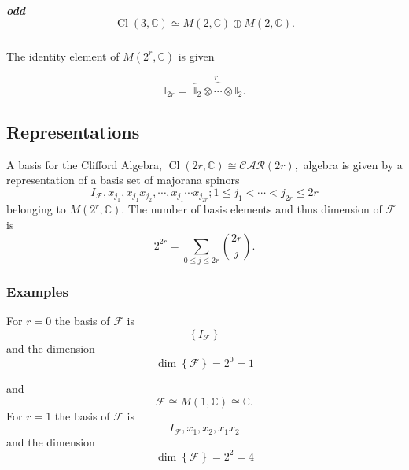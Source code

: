 \documentclass[aps,preprint]{revtex4}%
\begin{document}
\subparagraph{odd%
\begin{equation}
\operatorname*{Cl}\left(  3,\mathbb{C}\right)  \simeq M\left(  2,\mathbb{C}%
\right)  \oplus M\left(  2,\mathbb{C}\right)  .
\end{equation}
}

The identity element of $M\left(  2^{r},\mathbb{C}\right)  $ is given%

\begin{equation}
\mathbb{I}_{2r}=\overset{r}{\,\,\overbrace{\mathbb{I}_{2}\otimes\cdots
\otimes\mathbb{I}_{2}}}.
\end{equation}


\subsection{Representations}

A basis for the Clifford Algebra, $\operatorname*{Cl}\left(  2r,\mathbb{C}%
\right)  \cong\mathcal{CAR}\left(  2r\right)  ,$ algebra is given by a
representation of a basis set of majorana spinors
\begin{equation}
I_{\mathcal{F}},x_{j_{1}},x_{j_{1}}x_{j_{2}},\cdots,x_{j_{1}}\cdots x_{j_{2r}%
};1\leq j_{1}<\cdots<j_{2r}\leq2r
\end{equation}
belonging to $M\left(  2^{r},\mathbb{C}\right)  .$ The number of basis
elements and thus dimension of $\mathcal{F}$ is
\begin{equation}
2^{2r}=\sum_{0\leq j\leq2r}\binom{2r}{j}.
\end{equation}


\subsubsection{ Examples}

For $r=0$ the basis of $\mathcal{F}$ is%
\begin{equation}
\left\{  I_{\mathcal{F}}\right\}
\end{equation}
and the dimension
\begin{equation}
\dim\left\{  \mathcal{F}\right\}  =2^{0}=1
\end{equation}


and
\begin{equation}
\mathcal{F}\cong M\left(  1,\mathbb{C}\right)  \cong\mathbb{C}.
\end{equation}
For $r=1$ the basis of $\mathcal{F}$ is
\begin{equation}
I_{\mathcal{F}},x_{1},x_{2},x_{1}x_{2}%
\end{equation}
and the dimension%
\begin{equation}
\dim\left\{  \mathcal{F}\right\}  =2^{2}=4
\end{equation}
\end{document}
